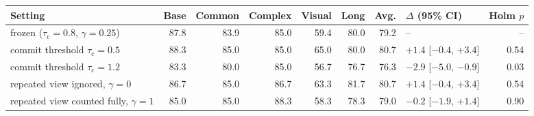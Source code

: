 \begin{tabular}{@{}lrrrrrrlr@{}}
\toprule
Setting & Base & Common & Complex & Visual & Long & Avg. & $\Delta$ (95\% CI) & Holm $p$\\
\midrule
frozen ($\tau_\mathrm{c}=0.8$, $\gamma=0.25$) & 87.8 & 83.9 & 85.0 & 59.4 & 80.0 & 79.2 & -- & --\\
commit threshold $\tau_\mathrm{c}=0.5$ & 88.3 & 85.0 & 85.0 & 65.0 & 80.0 & 80.7 & $+1.4$ {\footnotesize[$-0.4$, $+3.4$]} & 0.54\\
commit threshold $\tau_\mathrm{c}=1.2$ & 83.3 & 80.0 & 85.0 & 56.7 & 76.7 & 76.3 & $-2.9$ {\footnotesize[$-5.0$, $-0.9$]} & 0.03\\
repeated view ignored, $\gamma=0$ & 86.7 & 85.0 & 86.7 & 63.3 & 81.7 & 80.7 & $+1.4$ {\footnotesize[$-0.4$, $+3.4$]} & 0.54\\
repeated view counted fully, $\gamma=1$ & 85.0 & 85.0 & 88.3 & 58.3 & 78.3 & 79.0 & $-0.2$ {\footnotesize[$-1.9$, $+1.4$]} & 0.90\\
\bottomrule
\end{tabular}
